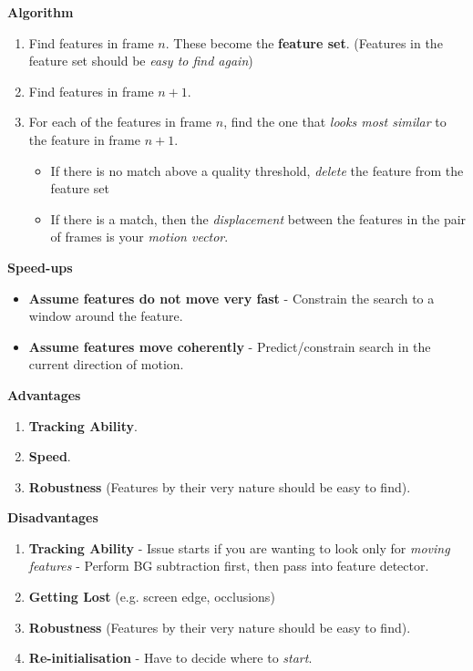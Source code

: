 \documentclass[english, 10pt]{article}
\begin{document}
\textbf{Algorithm}

\begin{enumerate}
\item Find features in frame $n$. These become the \textbf{feature set}. (Features in the feature set should be \textit{easy to find again})
\item Find features in frame $n+1$.
\item For each of the features in frame $n$, find the one that \textit{looks most similar} to the feature in frame $n+1$. 
\begin{itemize}
\item If there is no match above a quality threshold, \textit{delete} the feature from the feature set
\item If there is a match, then the \textit{displacement} between the features in the pair of frames is your \textit{motion vector}.
\end{itemize}
\end{enumerate}

\textbf{Speed-ups}

\begin{itemize}
\item \textbf{Assume features do not move very fast} - Constrain the search to a window around the feature.
\item \textbf{Assume features move coherently} - Predict/constrain search in the current direction of motion.
\end{itemize}

\textbf{Advantages}

\begin{enumerate}
\item \textbf{Tracking Ability}.
\item \textbf{Speed}.
\item \textbf{Robustness} (Features by their very nature should be easy to find).
\end{enumerate}

\textbf{Disadvantages}

\begin{enumerate}
\item \textbf{Tracking Ability} - Issue starts if you are wanting to look only for \textit{moving features} - Perform BG subtraction first, then pass into feature detector.
\item \textbf{Getting Lost} (e.g. screen edge, occlusions)
\item \textbf{Robustness} (Features by their very nature should be easy to find).
\item \textbf{Re-initialisation} - Have to decide where to \textit{start}. 
\end{enumerate}
\end{document}

